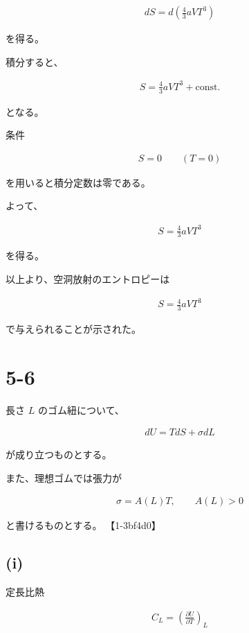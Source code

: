 \documentclass[platex,dvipdfmx,a4paper]{jsarticle}
\begin{document}
\begin{align*}
dS
=
d
\left(
\frac43aVT^3
\right)
\end{align*}

を得る。

積分すると、

\begin{align*}
S
=
\frac43aVT^3+\mathrm{const.}
\end{align*}

となる。

条件

\begin{align*}
S=0
\qquad
(T=0)
\end{align*}

を用いると積分定数は零である。

よって、

\begin{align*}
S
=
\frac43aVT^3
\end{align*}

を得る。

以上より、空洞放射のエントロピーは

\begin{align*}
S
=
\frac43aVT^3
\end{align*}

で与えられることが示された。
\section{5-6}

長さ $L$ のゴム紐について、

\begin{align*}
dU
=
TdS+\sigma dL
\end{align*}

が成り立つものとする。

また、理想ゴムでは張力が

\begin{align*}
\sigma=A(L)T,
\qquad
A(L)>0
\end{align*}

と書けるものとする。 【1-3bf4d0】

\subsection{(i)}

定長比熱

\begin{align*}
C_L
=
\left(
\frac{\partial U}{\partial T}
\right)_L
\end{align*}
\end{document}
